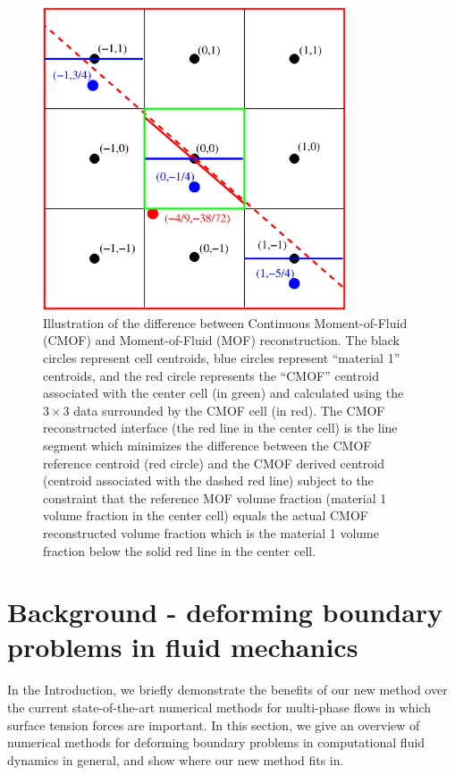 \documentclass[]{article}
\begin{document}
\begin{figure}[htbp]
\centering
\includegraphics[width=0.8\textwidth]{CMOFcentroid.eps}
\caption{
 Illustration of the difference between Continuous
 Moment-of-Fluid (CMOF) and Moment-of-Fluid (MOF) reconstruction.
 The black circles represent cell centroids, blue circles represent 
 ``material 1'' centroids, and the red circle represents the ``CMOF''
 centroid associated with the center cell (in green) and calculated using
 the $3\times 3$ data surrounded by the CMOF cell (in red).  The CMOF
 reconstructed interface (the red line in the center cell) is the line
 segment which minimizes the difference between the CMOF reference 
 centroid (red circle) and the CMOF derived centroid (centroid associated
 with the dashed red line) subject to the constraint that
 the reference MOF volume fraction (material 1 volume fraction in the 
 center cell) equals the actual CMOF reconstructed
 volume fraction which is the material 1 volume
 fraction below the solid red line in the center cell.
 \label{CMOFcentroid} }
\end{figure}

\section{Background - deforming boundary problems in fluid mechanics}

In the Introduction, we briefly demonstrate the benefits of our
new method over the current state-of-the-art numerical methods
for multi-phase flows in which surface tension forces are important.  
In this section, we give an overview of numerical methods for 
deforming boundary problems in computational fluid dynamics in general,
and show where our new method fits in.
\end{document}
